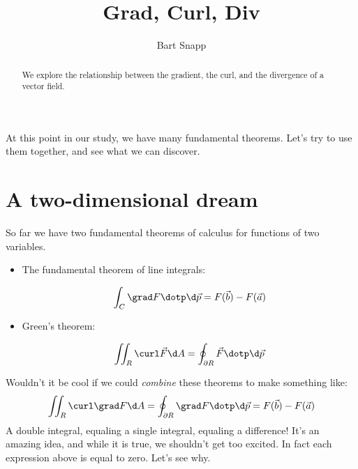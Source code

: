 \documentclass{ximera}
\author{Bart Snapp}
\title[Dig-In:]{Grad, Curl, Div}
\begin{document}
\begin{abstract}
  We explore the relationship between the gradient, the curl, and the
  divergence of a vector field.
\end{abstract}
\maketitle

At this point in our study, we have many fundamental theorems. Let's
try to use them together, and see what we can discover.

\section{A two-dimensional dream}

So far we have two fundamental theorems of calculus for functions of
two variables.
\begin{itemize}
\item The fundamental theorem of line integrals:
  \begin{image}
\end{image}
  \[
  \int_C \grad F \dotp\d\vec{p} = F(\vec{b}) -F(\vec{a})
  \]
\item Green's theorem:
  \begin{image}
  \end{image}
  \[
  \iint_R \curl \vec{F} \d A = \oint_{\partial R} \vec{F} \dotp \d \vec{p}
  \]
\end{itemize}
Wouldn't it be cool if we could \textit{combine} these theorems to
make something like:
\[
\iint_R \curl \grad F \d A = \oint_{\partial R} \grad F \dotp \d \vec{p} = F(\vec{b}) - F(\vec{a})
\]
A double integral, equaling a single integral, equaling a difference!
It's an amazing idea, and while it is true, we shouldn't get too
excited. In fact each expression above is equal to zero. Let's see
why.
\end{document}
